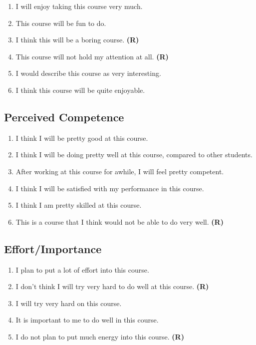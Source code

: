 \documentclass[letterpaper, nobind]{templates/ociamthesis}
\providecommand{\tightlist}{%
  \setlength{\itemsep}{0pt}\setlength{\parskip}{0pt}}
\begin{document}
\begin{enumerate}
\def\labelenumi{\arabic{enumi}.}
\tightlist
\item
  I will enjoy taking this course very much.
\item
  This course will be fun to do.
\item
  I think this will be a boring course. \textbf{(R)}
\item
  This course will not hold my attention at all. \textbf{(R)}
\item
  I would describe this course as very interesting.
\item
  I think this course will be quite enjoyable.
\end{enumerate}

\hypertarget{perceived-competence}{%
\subsection{Perceived Competence}\label{perceived-competence}}

\begin{enumerate}
\def\labelenumi{\arabic{enumi}.}
\tightlist
\item
  I think I will be pretty good at this course.
\item
  I think I will be doing pretty well at this course, compared to other students.
\item
  After working at this course for awhile, I will feel pretty competent.
\item
  I think I will be satisfied with my performance in this course.
\item
  I think I am pretty skilled at this course.
\item
  This is a course that I think would not be able to do very well. \textbf{(R)}
\end{enumerate}

\hypertarget{effortimportance}{%
\subsection{Effort/Importance}\label{effortimportance}}

\begin{enumerate}
\def\labelenumi{\arabic{enumi}.}
\tightlist
\item
  I plan to put a lot of effort into this course.
\item
  I don't think I will try very hard to do well at this course. \textbf{(R)}
\item
  I will try very hard on this course.
\item
  It is important to me to do well in this course.
\item
  I do not plan to put much energy into this course. \textbf{(R)}
\end{enumerate}
\end{document}
